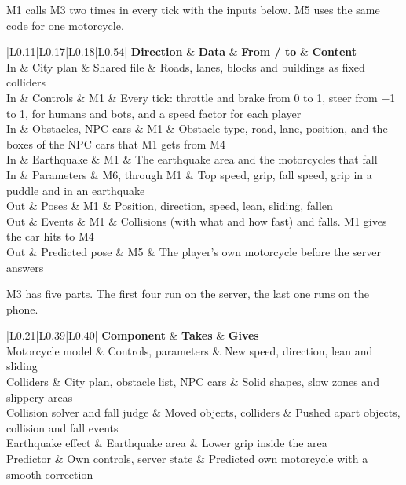 \documentclass[
  english,
  10pt,
  a4paper,
]{article}
\newcommand{\ckkeep}[1]{\par\noindent\begin{minipage}{\linewidth}\setlength{\parskip}{4pt}#1\end{minipage}\par\smallskip}
\begin{document}

\ckkeep{%
M1 calls M3 two times in every tick with the inputs below. M5 uses the same code for one motorcycle.

\begin{tabular}{|L{0.11}|L{0.17}|L{0.18}|L{0.54}|}
\hline \textbf{Direction} & \textbf{Data} & \textbf{From / to} & \textbf{Content} \\ \hline 
In & City plan & Shared file & Roads, lanes, blocks and buildings as fixed colliders \\ \hline
In & Controls & M1 & Every tick: throttle and brake from 0 to 1, steer from −1 to 1, for humans and bots, and a speed factor for each player \\ \hline
In & Obstacles, NPC cars & M1 & Obstacle type, road, lane, position, and the boxes of the NPC cars that M1 gets from M4 \\ \hline
In & Earthquake & M1 & The earthquake area and the motorcycles that fall \\ \hline
In & Parameters & M6, through M1 & Top speed, grip, fall speed, grip in a puddle and in an earthquake \\ \hline
Out & Poses & M1 & Position, direction, speed, lean, sliding, fallen \\ \hline
Out & Events & M1 & Collisions (with what and how fast) and falls. M1 gives the car hits to M4 \\ \hline
Out & Predicted pose & M5 & The player's own motorcycle before the server answers \\ \hline
\end{tabular}}


\ckkeep{%
M3 has five parts. The first four run on the server, the last one runs on the phone.

\begin{tabular}{|L{0.21}|L{0.39}|L{0.40}|}
\hline \textbf{Component} & \textbf{Takes} & \textbf{Gives} \\ \hline 
Motorcycle model & Controls, parameters & New speed, direction, lean and sliding \\ \hline
Colliders & City plan, obstacle list, NPC cars & Solid shapes, slow zones and slippery areas \\ \hline
Collision solver and fall judge & Moved objects, colliders & Pushed apart objects, collision and fall events \\ \hline
Earthquake effect & Earthquake area & Lower grip inside the area \\ \hline
Predictor & Own controls, server state & Predicted own motorcycle with a smooth correction \\ \hline
\end{tabular}}
\end{document}
